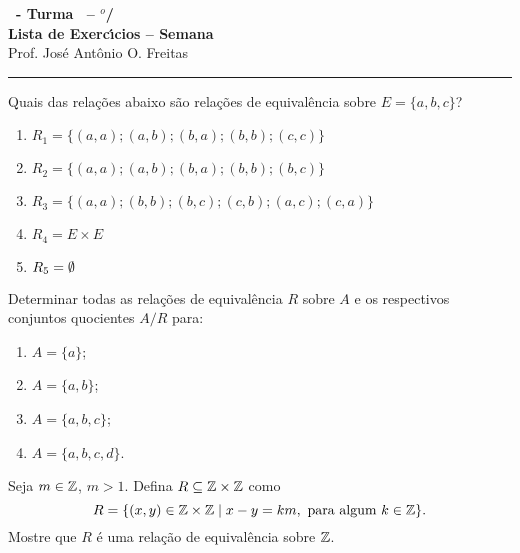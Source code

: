 \documentclass[12pt]{exam}
\begin{document}
    \begin{center}
    {\Large\bf \disciplina\ - Turma \turma\ -- \semestre$^{o}$/\ano} \\ \vspace{9pt} {\large\bf
        Lista de Exerc{\'\i}cios -- Semana \numerosemana}\\ \vspace{9pt} Prof. Jos{\'e} Ant{\^o}nio O. Freitas
    \end{center}
    \hrule

    \vspace{.6cm}

    \questao{} Quais das rela{\c c}{\~o}es abaixo s{\~a}o rela{\c c}{\~o}es de equival{\^e}ncia sobre $E = \{a,b,c\}$?
    \begin{enumerate}[label={\alph*})]
        \item $R_1 = \{(a,a);(a,b);(b,a);(b,b);(c,c)\}$

        \item $R_2 = \{(a,a);(a,b);(b,a);(b,b);(b,c)\}$

        \item $R_3 = \{(a,a);(b,b);(b,c);(c,b);(a,c);(c,a)\}$

        \item $R_4 = E \times E$

        \item $R_5 = \emptyset$
    \end{enumerate}

    \vspace{.3cm}

    \questao{} Determinar todas as rela{\c c}{\~o}es de equival{\^e}ncia
    $R$ sobre $A$ e os respectivos conjuntos quocientes $A/R$ para:
    \begin{enumerate}[label={\alph*})]
        \item $A=\{a\}$;

        \item $A=\{a,b\}$;

        \item $A=\{a,b,c\}$;

        \item $A=\{a,b,c,d\}$.
    \end{enumerate}

    \vspace{.3cm}

    \questao{} Seja $m \in \mathbb{Z}$, $m > 1$. Defina $R \subseteq \mathbb{Z}\times\mathbb{Z}$ como
    \[
      R = \{(x,y) \in \mathbb{Z}\times\mathbb{Z} \mid x - y = km, \mbox{ para algum } k \in \mathbb{Z}\}.
    \]
    Mostre que $R$ \'e uma rela\c{c}\~ao de equival\^encia sobre $\mathbb{Z}$.
\end{document}
